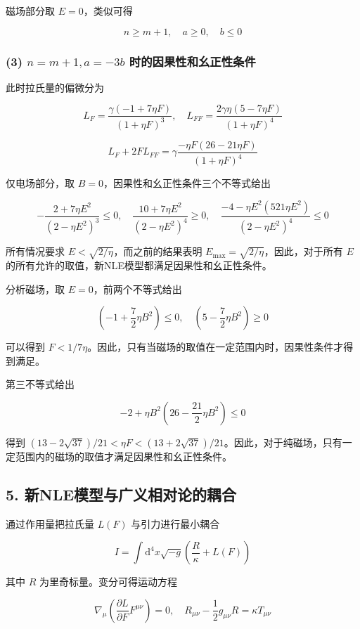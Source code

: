 \documentclass[aps,prl,preprint,groupedaddress,showkeys]{revtex4-2}
\begin{document}
磁场部分取 $E=0 $，类似可得

$$
n\geq m+1,\quad a\geq 0,\quad b\leq 0
$$

\subsubsection{(3) $n=m+1,a=-3b $ 时的因果性和幺正性条件}

此时拉氏量的偏微分为

$$
L_F
=\frac{\gamma\left(-1+7\eta F \right) }{\left(1+\eta F \right)^3 },\quad
L_{FF}
=\frac{2\gamma \eta\left(5-7\eta F \right) }{\left(1+\eta F \right)^4 } 
$$

$$
L_F + 2FL_{FF} 
=\gamma \frac{-\eta F\left(26-21\eta F \right) }{\left(1+\eta F \right)^4 }
$$

仅电场部分，取 $B=0 $，因果性和幺正性条件三个不等式给出
    
$$
-\frac{2+7\eta E^2 }{\left(2-\eta E^2 \right)^3 } \leq 0,\quad
\frac{10+7\eta E^2 }{\left(2-\eta E^2 \right)^4 } \geq 0,\quad
\frac{-4-\eta E^2\left(521\eta E^2 \right) }{\left(2-\eta E^2 \right)^4 } \leq 0
$$

所有情况要求 $E<\sqrt{2/\eta} $，而之前的结果表明 $E_{\max}=\sqrt{2/\eta} $，因此，对于所有 $E$ 的所有允许的取值，新NLE模型都满足因果性和幺正性条件。

分析磁场，取 $E=0 $，前两个不等式给出

$$
\left(-1+\frac{7 }{2 } \eta B^2 \right)\leq 0,\quad
\left(5-\frac{7 }{2 } \eta B^2 \right)\geq 0
$$

可以得到 $F<1/7\eta $。因此，只有当磁场的取值在一定范围内时，因果性条件才得到满足。

第三不等式给出

$$
-2+\eta B^2\left(26-\frac{21 }{2 } \eta B^2 \right)\leq 0
$$

得到 $(13-2\sqrt{37})/21<\eta F<(13+2\sqrt{37})/21 $。因此，对于纯磁场，只有一定范围内的磁场的取值才满足因果性和幺正性条件。

\subsection{5. 新NLE模型与广义相对论的耦合}

通过作用量把拉氏量 $L(F) $ 与引力进行最小耦合

$$
I
=\int \mathrm{d}^4 x\sqrt{-g}\left(\frac{R }{\kappa } + L(F) \right) 
$$

其中 $R $ 为里奇标量。变分可得运动方程

$$
\nabla_\mu\left(\frac{\partial L }{\partial F } F^{\mu\nu} \right)
=0,\quad
R_{\mu\nu} - \frac{1 }{2 } g_{\mu\nu} R
=\kappa T_{\mu\nu}
$$
\end{document}

